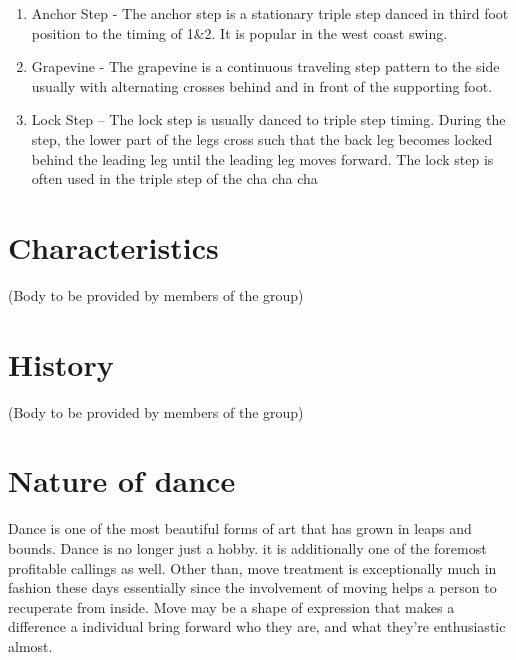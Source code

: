 \documentclass{article}
\begin{document}
\begin{enumerate}
 \item  Anchor Step - The anchor step is a stationary triple step danced in third foot position to the timing of 1\&2. It is popular in the west coast swing.
 
 \item  Grapevine - The grapevine is a continuous traveling step pattern to the side usually with alternating crosses behind and in front of the supporting foot.
 
 \item  Lock Step – The lock step is usually danced to triple step timing. During the step, the lower part of the legs cross such that the back leg becomes locked behind the leading leg until the leading leg moves forward. The lock step is often used in the triple step of the cha cha cha
\end{enumerate}
\section{Characteristics}
(Body to be provided by members of the group)


\section{History}
(Body to be provided by members of the group)

\section{Nature of dance}
Dance is one of the most beautiful forms of art that has grown in leaps and bounds. Dance is no longer just a hobby. it is additionally one of the foremost profitable callings as well. Other than, move treatment is exceptionally much in fashion these days essentially since the involvement of moving helps a person to recuperate from inside. Move may be a shape of expression that makes a difference a individual bring forward who they are, and what they're enthusiastic almost.
\end{document}
